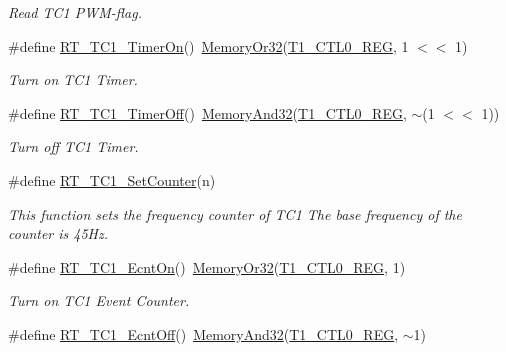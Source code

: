 \begin{DoxyCompactItemize}
\begin{DoxyCompactList}\small\item\em Read T\+C1 P\+W\+M-\/flag. \end{DoxyCompactList}\item 
\#define \mbox{\hyperlink{a00044_ac76393581e0b1d58a9628139db72cdaf}{R\+T\+\_\+\+T\+C1\+\_\+\+Timer\+On}}()~\mbox{\hyperlink{a00020_a27874a97deab7cecdde5ddecf466e31e}{Memory\+Or32}}(\mbox{\hyperlink{a00020_adadaa0ab1ebbd7ba9b70dfd24c3ed44da38632250c2e72df96fcaa3f8bd8ecc5e}{T1\+\_\+\+C\+T\+L0\+\_\+\+R\+EG}}, 1 $<$$<$ 1)
\begin{DoxyCompactList}\small\item\em Turn on T\+C1 Timer. \end{DoxyCompactList}\item 
\#define \mbox{\hyperlink{a00044_a1bccbc833364c4f1c6ce63a758136817}{R\+T\+\_\+\+T\+C1\+\_\+\+Timer\+Off}}()~\mbox{\hyperlink{a00020_ad87cedffcaadc51db22594fce55173d4}{Memory\+And32}}(\mbox{\hyperlink{a00020_adadaa0ab1ebbd7ba9b70dfd24c3ed44da38632250c2e72df96fcaa3f8bd8ecc5e}{T1\+\_\+\+C\+T\+L0\+\_\+\+R\+EG}}, $\sim$(1 $<$$<$ 1))
\begin{DoxyCompactList}\small\item\em Turn off T\+C1 Timer. \end{DoxyCompactList}\item 
\#define \mbox{\hyperlink{a00044_ac04f2d9427689062596382399aa7d909}{R\+T\+\_\+\+T\+C1\+\_\+\+Set\+Counter}}(n)
\begin{DoxyCompactList}\small\item\em This function sets the frequency counter of T\+C1 The base frequency of the counter is 45\+Hz. \end{DoxyCompactList}\item 
\#define \mbox{\hyperlink{a00044_add9b6f778a744d79226f5165a04a38d9}{R\+T\+\_\+\+T\+C1\+\_\+\+Ecnt\+On}}()~\mbox{\hyperlink{a00020_a27874a97deab7cecdde5ddecf466e31e}{Memory\+Or32}}(\mbox{\hyperlink{a00020_adadaa0ab1ebbd7ba9b70dfd24c3ed44da38632250c2e72df96fcaa3f8bd8ecc5e}{T1\+\_\+\+C\+T\+L0\+\_\+\+R\+EG}}, 1)
\begin{DoxyCompactList}\small\item\em Turn on T\+C1 Event Counter. \end{DoxyCompactList}\item 
\#define \mbox{\hyperlink{a00044_a1c9b9839a03d3e9b1158a2be2feebf42}{R\+T\+\_\+\+T\+C1\+\_\+\+Ecnt\+Off}}()~\mbox{\hyperlink{a00020_ad87cedffcaadc51db22594fce55173d4}{Memory\+And32}}(\mbox{\hyperlink{a00020_adadaa0ab1ebbd7ba9b70dfd24c3ed44da38632250c2e72df96fcaa3f8bd8ecc5e}{T1\+\_\+\+C\+T\+L0\+\_\+\+R\+EG}}, $\sim$1)

\end{DoxyCompactItemize}
